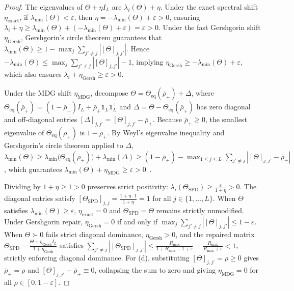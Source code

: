 \documentclass[default,sn-mathphys,Numbered]{sn-jnl}
\theoremstyle{thmstyleone}
\theoremstyle{thmstylethree}
\theoremstyle{thmstyletwo}
\begin{document}
\begin{proof}
The eigenvalues of $\Theta + \eta I_L$ are $\lambda_i(\Theta) + \eta$. Under the exact spectral shift $\eta_{\mathrm{exact}}$, if $\lambda_{\min}(\Theta) < \varepsilon$, then $\eta = -\lambda_{\min}(\Theta) + \varepsilon > 0$, ensuring $\lambda_i + \eta \ge \lambda_{\min}(\Theta) + (-\lambda_{\min}(\Theta) + \varepsilon) = \varepsilon > 0$. Under the fast Gershgorin shift $\eta_{\mathrm{Gersh}}$, Gershgorin's circle theorem guarantees that $\lambda_{\min}(\Theta) \ge 1 - \max_j \sum_{j' \neq j} |[\Theta]_{j, j'}|$. Hence $-\lambda_{\min}(\Theta) \le \max_j \sum_{j' \neq j} |[\Theta]_{j, j'}| - 1$, implying $\eta_{\mathrm{Gersh}} \ge -\lambda_{\min}(\Theta) + \varepsilon$, which also ensures $\lambda_i + \eta_{\mathrm{Gersh}} \ge \varepsilon > 0$.

Under the MDG shift $\eta_{\mathrm{MDG}}$, decompose $\Theta = \Theta_{\mathrm{eq}}(\bar{\rho}_+) + \Delta$, where $\Theta_{\mathrm{eq}}(\bar{\rho}_+) = (1 - \bar{\rho}_+) I_L + \bar{\rho}_+ \mathds{1}_L \mathds{1}_L^\top$ and $\Delta = \Theta - \Theta_{\mathrm{eq}}(\bar{\rho}_+)$ has zero diagonal and off-diagonal entries $[\Delta]_{j, j'} = [\Theta]_{j, j'} - \bar{\rho}_+$. Because $\bar{\rho}_+ \ge 0$, the smallest eigenvalue of $\Theta_{\mathrm{eq}}(\bar{\rho}_+)$ is $1 - \bar{\rho}_+$. By Weyl's eigenvalue inequality and Gershgorin's circle theorem applied to $\Delta$, $\lambda_{\min}(\Theta) \ge \lambda_{\min}\bigl(\Theta_{\mathrm{eq}}(\bar{\rho}_+)\bigr) + \lambda_{\min}(\Delta) \ge (1 - \bar{\rho}_+) - \max_{1 \le j \le L} \sum_{j' \neq j} |[\Theta]_{j, j'} - \bar{\rho}_+|$, which guarantees $\lambda_{\min}(\Theta) + \eta_{\mathrm{MDG}} \ge \varepsilon > 0$~\citep{athreya2018statistical}.

Dividing by $1 + \eta \ge 1 > 0$ preserves strict positivity: $\lambda_i(\Theta_{\mathrm{SPD}}) \ge \frac{\varepsilon}{1 + \eta} > 0$. The diagonal entries satisfy $[\Theta_{\mathrm{SPD}}]_{j, j} = \frac{1 + \eta \cdot 1}{1 + \eta} = 1$ for all $j \in \{1, \ldots, L\}$. When $\Theta$ satisfies $\lambda_{\min}(\Theta) \ge \varepsilon$, $\eta_{\mathrm{exact}} = 0$ and $\Theta_{\mathrm{SPD}} = \Theta$ remains strictly unmodified. Under Gershgorin repair, $\eta_{\mathrm{Gersh}} = 0$ if and only if $\max_j \sum_{j' \neq j} |[\Theta]_{j, j'}| \le 1 - \varepsilon$. When $\Theta \succ 0$ fails strict diagonal dominance, $\eta_{\mathrm{Gersh}} > 0$, and the repaired matrix $\Theta_{\mathrm{SPD}} = \frac{\Theta + \eta_{\mathrm{Gersh}} I_L}{1 + \eta_{\mathrm{Gersh}}}$ satisfies $\sum_{j' \neq j} |[\Theta_{\mathrm{SPD}}]_{j, j'}| \le \frac{R_{\max}}{1 + R_{\max} - 1 + \varepsilon} = \frac{R_{\max}}{R_{\max} + \varepsilon} < 1$, strictly enforcing diagonal dominance. For (d), substituting $[\Theta]_{j, j'} = \rho \ge 0$ gives $\bar{\rho}_+ = \rho$ and $[\Theta]_{j, j'} - \bar{\rho}_+ \equiv 0$, collapsing the sum to zero and giving $\eta_{\mathrm{MDG}} = 0$ for all $\rho \in [0, 1 - \varepsilon]$.


\end{proof}
\end{document}
